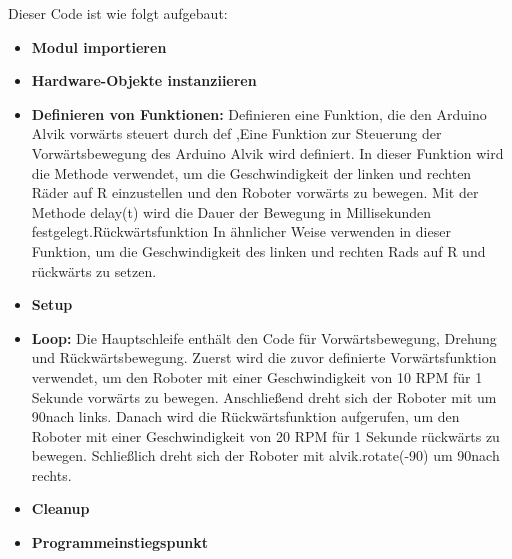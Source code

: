\begin{enumerate}
{	}
	Dieser Code ist wie folgt aufgebaut:
	\begin{itemize}
		\item \textbf{Modul importieren}%
		\item \textbf{Hardware-Objekte instanziieren}
		\item \textbf{Definieren von Funktionen:} Definieren eine Funktion, die den Arduino Alvik vorwärts steuert durch def ,Eine Funktion zur Steuerung der Vorwärtsbewegung des Arduino Alvik wird definiert. In dieser Funktion wird die Methode  verwendet, um die Geschwindigkeit der linken und rechten Räder auf R einzustellen und den Roboter vorwärts zu bewegen. Mit der Methode delay(t) wird die Dauer der Bewegung in Millisekunden festgelegt.Rückwärtsfunktion  In ähnlicher Weise verwenden  in dieser Funktion, um die Geschwindigkeit des linken und rechten Rads auf R und rückwärts zu setzen.
		\item \textbf{Setup}
		\item \textbf{Loop:} Die Hauptschleife enthält den Code für Vorwärtsbewegung, Drehung und Rückwärtsbewegung. Zuerst wird die zuvor definierte Vorwärtsfunktion  verwendet, um den Roboter mit einer Geschwindigkeit von 10 RPM für 1 Sekunde vorwärts zu bewegen. Anschlie\ss end dreht sich der Roboter mit  um 90\textdegree nach links. Danach wird die Rückwärtsfunktion  aufgerufen, um den Roboter mit einer Geschwindigkeit von 20 RPM für 1 Sekunde rückwärts zu bewegen. Schlie\ss lich dreht sich der Roboter mit alvik.rotate(-90) um 90\textdegree nach rechts.
		\item \textbf{Cleanup}
		\item \textbf{Programmeinstiegspunkt}
	\end{itemize}
	
\end{enumerate}




